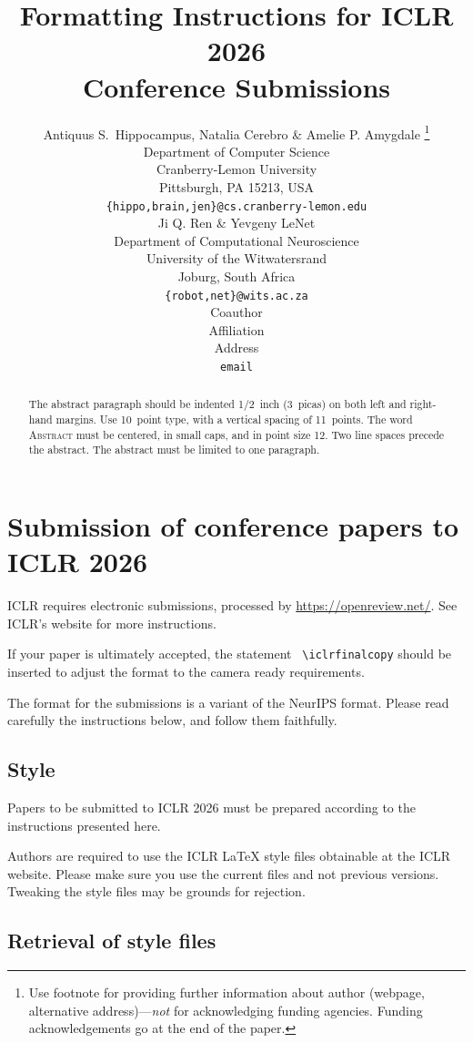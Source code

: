 \documentclass{article} %
\title{Formatting Instructions for ICLR 2026 \\ Conference Submissions}
\author{Antiquus S.~Hippocampus, Natalia Cerebro \& Amelie P. Amygdale \thanks{ Use footnote for providing further information
about author (webpage, alternative address)---\emph{not} for acknowledging
funding agencies.  Funding acknowledgements go at the end of the paper.} \\
Department of Computer Science\\
Cranberry-Lemon University\\
Pittsburgh, PA 15213, USA \\
\texttt{\{hippo,brain,jen\}@cs.cranberry-lemon.edu} \\
\And
Ji Q. Ren \& Yevgeny LeNet \\
Department of Computational Neuroscience \\
University of the Witwatersrand \\
Joburg, South Africa \\
\texttt{\{robot,net\}@wits.ac.za} \\
\AND
Coauthor \\
Affiliation \\
Address \\
\texttt{email}
}
\begin{document}
\maketitle

\begin{abstract}
The abstract paragraph should be indented 1/2~inch (3~picas) on both left and
right-hand margins. Use 10~point type, with a vertical spacing of 11~points.
The word \textsc{Abstract} must be centered, in small caps, and in point size 12. Two
line spaces precede the abstract. The abstract must be limited to one
paragraph.
\end{abstract}

\section{Submission of conference papers to ICLR 2026}

ICLR requires electronic submissions, processed by
\url{https://openreview.net/}. See ICLR's website for more instructions.

If your paper is ultimately accepted, the statement {\tt
  {\textbackslash}iclrfinalcopy} should be inserted to adjust the
format to the camera ready requirements.

The format for the submissions is a variant of the NeurIPS format.
Please read carefully the instructions below, and follow them
faithfully.

\subsection{Style}

Papers to be submitted to ICLR 2026 must be prepared according to the
instructions presented here.


Authors are required to use the ICLR \LaTeX{} style files obtainable at the
ICLR website. Please make sure you use the current files and
not previous versions. Tweaking the style files may be grounds for rejection.

\subsection{Retrieval of style files}
\end{document}
